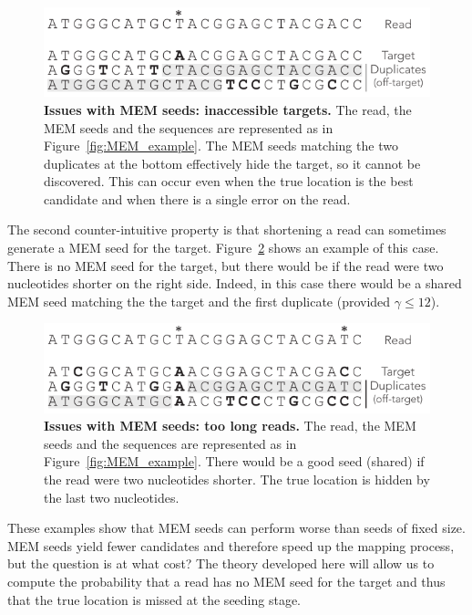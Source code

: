 \documentclass{article}
\begin{document}
\begin{figure}[h]
\centering
\includegraphics[scale=1]{full_masking_example.pdf}
\caption{\textbf{Issues with MEM seeds: inaccessible targets.}
The read, the MEM seeds and the sequences are represented as in
Figure~\ref{fig:MEM_example}. The MEM seeds matching the two duplicates
at the bottom effectively hide the target, so it cannot be discovered.
This can occur even when the true location is the best candidate and when
there is a single error on the read.}
\label{fig:full_masking_example}
\end{figure}

The second counter-intuitive property is that shortening a read can
sometimes generate a MEM seed for the target. Figure~\ref{fig:short_vs_long}
shows an example of this case. There is no MEM seed for the target, but
there would be if the read were two nucleotides shorter on the right
side. Indeed, in this case there would be a shared MEM seed matching the
the target and the first duplicate (provided $\gamma \leq 12$).


\begin{figure}[h]
\centering
\includegraphics[scale=1]{short_vs_long_example.pdf}
\caption{\textbf{Issues with MEM seeds: too long reads.}
The read, the MEM seeds and the sequences are represented as in
Figure~\ref{fig:MEM_example}. There would be a good seed (shared) if the
read were two nucleotides shorter. The true location is hidden by
the last two nucleotides.}
\label{fig:short_vs_long}
\end{figure}

These examples show that MEM seeds can perform worse than seeds of fixed
size. MEM seeds yield fewer candidates and therefore speed up the mapping
process, but the question is at what cost? The theory developed here will
allow us to compute the probability that a read has no MEM seed for the
target and thus that the true location is missed at the seeding stage.
\end{document}
